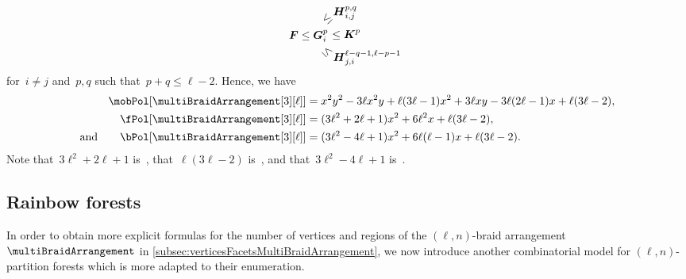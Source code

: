 \begin{example}
\[
\b{F} \le \b{G}_i^p \hspace{-.4cm} \begin{array}{l} \rotatebox[origin=c]{45}{$\le$} \raisebox{.2cm}{$\b{H}_{i,j}^{p,q}$} \\[.1cm] \quad \le \b{K}^p \\[.1cm] \rotatebox[origin=c]{-45}{$\le$} \raisebox{-.2cm}{$\b{H}_{j,i}^{\ell-q-1, \ell-p-1}$} \end{array}
\]
for~$i \ne j$ and~$p, q$ such that~$p + q \le \ell-2$.
Hence, we have
\begin{align*}
\mobPol[{\multiBraidArrangement[3][\ell]}] & = x^2 y^2 - 3 \ell x^2 y + \ell (3 \ell - 1) x^2 + 3 \ell x y - 3 \ell (2 \ell - 1) x + \ell (3 \ell - 2) , \\
\fPol[{\multiBraidArrangement[3][\ell]}] & = (3 \ell^2 + 2 \ell + 1) x^2 + 6 \ell^2 x + \ell (3 \ell - 2), \\
\text{and}\qquad
\bPol[{\multiBraidArrangement[3][\ell]}] & = (3 \ell^2 - 4 \ell + 1) x^2 + 6 \ell (\ell - 1) x + \ell (3 \ell - 2).
\end{align*}
Note that~$3 \ell^2 + 2 \ell + 1$ is~, that~$\ell (3 \ell - 2)$ is~, and that~$3 \ell^2 - 4 \ell + 1$ is~.
\end{example}

\begin{remark}
\end{remark}

\subsection{Rainbow forests}
\label{subsec:rainbowForests}

In order to obtain more explicit formulas for the number of vertices and regions of the $(\ell,n)$-braid arrangement~$\multiBraidArrangement$ in \cref{subsec:verticesFacetsMultiBraidArrangement}, we now introduce another combinatorial model for $(\ell,n)$-partition forests which is more adapted to their enumeration.

